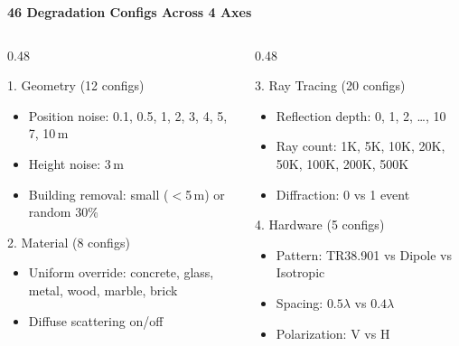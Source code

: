 \documentclass[
    aspectratio=169
]{beamer}
\begin{document}

\begin{frame}{\textbf{46 Degradation Configs Across 4 Axes}}
\vspace{-0.1cm}
\begin{columns}[T]
\begin{column}{0.48\textwidth}
\begin{block}{1. Geometry (12 configs)}
\begin{itemize}
    \item Position noise: 0.1, 0.5, 1, 2, 3, 4, 5, 7, 10\,m
    \item Height noise: 3\,m
    \item Building removal: small ($<$5\,m) or random 30\%
\end{itemize}
\end{block}
\begin{block}{2. Material (8 configs)}
\begin{itemize}
    \item Uniform override: concrete, glass, metal, wood, marble, brick
    \item Diffuse scattering on/off
\end{itemize}
\end{block}
\end{column}

\begin{column}{0.48\textwidth}
\begin{block}{3. Ray Tracing (20 configs)}
\begin{itemize}
    \item Reflection depth: 0, 1, 2, \ldots, 10
    \item Ray count: 1K, 5K, 10K, 20K, 50K, 100K, 200K, 500K
    \item Diffraction: 0 vs 1 event
\end{itemize}
\end{block}
\begin{block}{4. Hardware (5 configs)}
\begin{itemize}
    \item Pattern: TR38.901 vs Dipole vs Isotropic
    \item Spacing: $0.5\lambda$ vs $0.4\lambda$
    \item Polarization: V vs H
\end{itemize}
\end{block}
\end{column}
\end{columns}
\end{frame}
\end{document}
